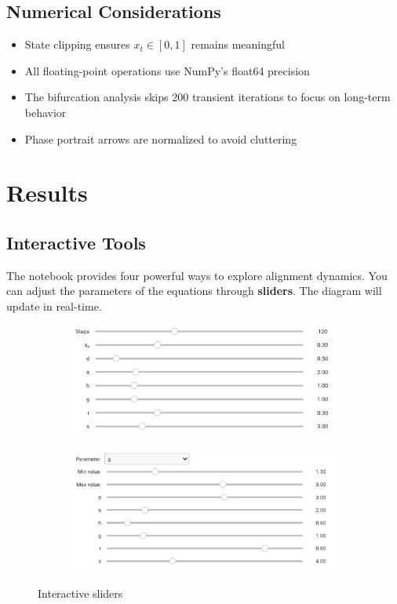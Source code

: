 \documentclass[a4paper, 10pt]{article}
\begin{document}
\subsection{Numerical Considerations}
\begin{itemize}
	\item State clipping ensures $x_t \in [0,1]$ remains meaningful
	\item All floating-point operations use NumPy's float64 precision
	\item The bifurcation analysis skips 200 transient iterations to focus on long-term behavior
	\item Phase portrait arrows are normalized to avoid cluttering
\end{itemize}

\clearpage
\section{Results}
\label{sec:results}
\subsection{Interactive Tools}
The notebook provides four powerful ways to explore alignment dynamics. 
You can adjust the parameters of the equations through \textbf{sliders}. The diagram will update in real-time.

\begin{figure}[h!]
    \centering
    \begin{subfigure}{0.45\textwidth}
        \centering
        \includegraphics[width=\linewidth]{../images/results/sliders1.pdf}
        \label{fig:sliders1}
    \end{subfigure}
    \hfill
    \begin{subfigure}{0.45\textwidth}
        \centering
        \includegraphics[width=\linewidth]{../images/results/sliders2.pdf}
        \label{fig:sliders2}
    \end{subfigure}
    \caption{Interactive sliders}
    \label{fig:side_by_side}
\end{figure}
\end{document}
